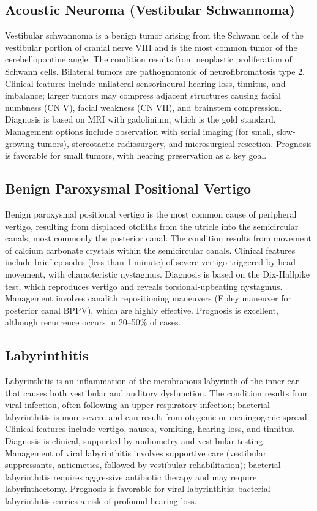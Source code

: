 \subsection{Acoustic Neuroma (Vestibular Schwannoma)}
\label{sec:Acoustic Neuroma (Vestibular Schwannoma)}
Vestibular schwannoma is a benign tumor arising from the Schwann cells of the vestibular portion of cranial nerve VIII and is the most common tumor of the cerebellopontine angle. The condition results from neoplastic proliferation of Schwann cells. Bilateral tumors are pathognomonic of neurofibromatosis type 2. Clinical features include unilateral sensorineural hearing loss, tinnitus, and imbalance; larger tumors may compress adjacent structures causing facial numbness (CN V), facial weakness (CN VII), and brainstem compression. Diagnosis is based on MRI with gadolinium, which is the gold standard. Management options include observation with serial imaging (for small, slow-growing tumors), stereotactic radiosurgery, and microsurgical resection. Prognosis is favorable for small tumors, with hearing preservation as a key goal.

\subsection{Benign Paroxysmal Positional Vertigo}
\label{sec:Benign Paroxysmal Positional Vertigo}
Benign paroxysmal positional vertigo is the most common cause of peripheral vertigo, resulting from displaced otoliths from the utricle into the semicircular canals, most commonly the posterior canal. The condition results from movement of calcium carbonate crystals within the semicircular canals. Clinical features include brief episodes (less than 1 minute) of severe vertigo triggered by head movement, with characteristic nystagmus. Diagnosis is based on the Dix-Hallpike test, which reproduces vertigo and reveals torsional-upbeating nystagmus. Management involves canalith repositioning maneuvers (Epley maneuver for posterior canal BPPV), which are highly effective. Prognosis is excellent, although recurrence occurs in 20--50\% of cases.

\subsection{Labyrinthitis}
\label{sec:Labyrinthitis}
Labyrinthitis is an inflammation of the membranous labyrinth of the inner ear that causes both vestibular and auditory dysfunction. The condition results from viral infection, often following an upper respiratory infection; bacterial labyrinthitis is more severe and can result from otogenic or meningogenic spread. Clinical features include vertigo, nausea, vomiting, hearing loss, and tinnitus. Diagnosis is clinical, supported by audiometry and vestibular testing. Management of viral labyrinthitis involves supportive care (vestibular suppressants, antiemetics, followed by vestibular rehabilitation); bacterial labyrinthitis requires aggressive antibiotic therapy and may require labyrinthectomy. Prognosis is favorable for viral labyrinthitis; bacterial labyrinthitis carries a risk of profound hearing loss.

